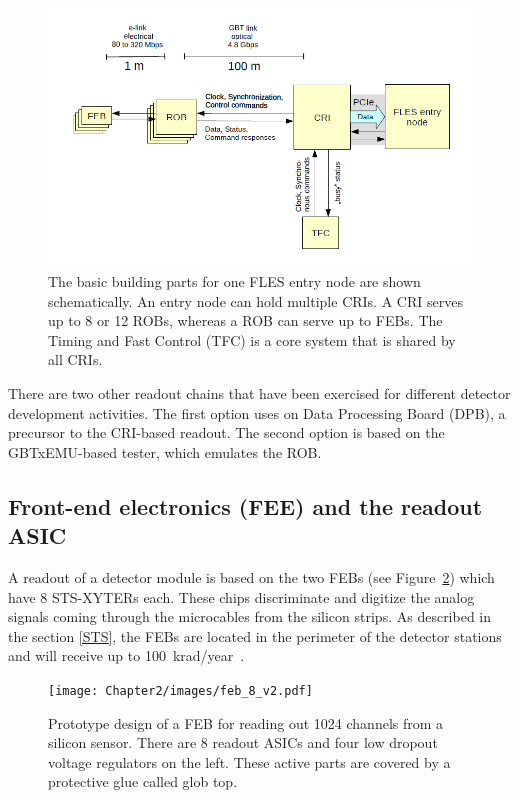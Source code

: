 \begin{figure}[!h]
\centering
\includegraphics[width=0.8\columnwidth]{Chapter2/images/CRI_DAQ.png}
\caption{The basic building parts for one \gls{FLES} entry node are shown schematically. An entry node can hold multiple \glspl{CRI}. A \gls{CRI} serves up to 8 or 12 \glspl{ROB}, whereas a \gls{ROB} can serve up to \glspl{FEB}. The Timing and Fast Control (\gls{TFC}) is a core system that is shared by all \glspl{CRI}.}
\label{fig_daq_schem}
\end{figure}

There are two other readout chains that have been exercised for different detector development activities. The first option uses on Data Processing Board (\gls{DPB}), a precursor
to the CRI-based readout. The second option is based on the GBTxEMU-based tester, which emulates the \gls{ROB}.


\subsection{Front-end electronics (FEE) and the readout ASIC}

A readout of a detector module is based on the two \glspl{FEB} (see Figure~\ref{fig_feb}) which have 8 STS-XYTERs each. These chips discriminate and digitize the analog signals coming through the microcables from the silicon strips. As described in the section \ref{STS}, the \glspl{FEB} are located in the perimeter of the detector stations and will receive up to 100~krad/year~\cite{Heuser:54798}.

\begin{figure}[!h]
\centering
\texttt{[image: Chapter2/images/feb\_8\_v2.pdf]}
\caption{Prototype design of a \gls{FEB} for reading out 1024 channels from a silicon sensor. There are 8 readout ASICs and four low dropout voltage regulators on the left. These active parts are covered by a protective glue called glob top.}
\label{fig_feb}
\end{figure}

